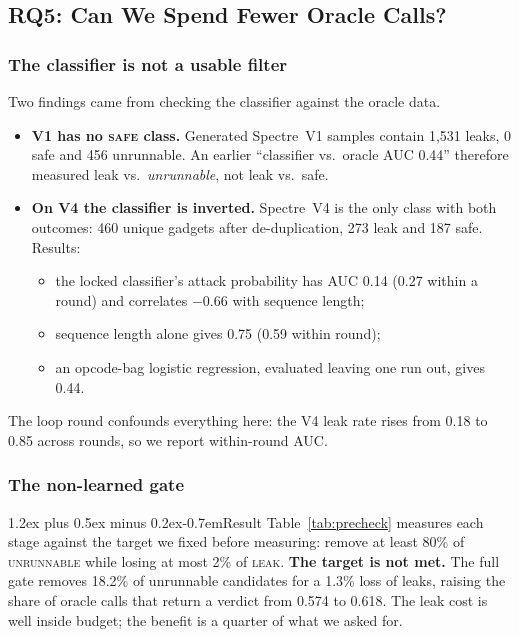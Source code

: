 \documentclass[conference]{IEEEtran}
\makeatletter
\renewcommand\paragraph{\@startsection{paragraph}{4}{\z@}%
  {1.2ex plus 0.5ex minus 0.2ex}{-0.7em}{\normalfont\normalsize\bfseries}}
\makeatother
\begin{document}

\subsection{RQ5: Can We Spend Fewer Oracle Calls?}
\label{sec:rank}

\subsubsection{The classifier is not a usable filter}
Two findings came from checking the classifier against the oracle data.
\begin{itemize}[itemsep=1pt,leftmargin=1.2em]
  \item \textbf{V1 has no {\normalfont\textsc{safe}} class.} Generated Spectre~V1 samples
    contain 1,531 leaks, 0 safe and 456 unrunnable. An earlier
    ``classifier vs.\ oracle AUC 0.44'' therefore measured leak vs.\
    \emph{unrunnable}, not leak vs.\ safe.
  \item \textbf{On V4 the classifier is inverted.} Spectre~V4 is the only
    class with both outcomes: 460 unique gadgets after de-duplication, 273
    leak and 187 safe. Results:
    \begin{itemize}[itemsep=0pt,leftmargin=1em]
      \item the locked classifier's attack probability has AUC 0.14 (0.27
        within a round) and correlates $-0.66$ with sequence length;
      \item sequence length alone gives 0.75 (0.59 within round);
      \item an opcode-bag logistic regression, evaluated leaving one run
        out, gives 0.44.
    \end{itemize}
\end{itemize}
The loop round confounds everything here: the V4 leak rate rises from 0.18 to 0.85
across rounds, so we report within-round AUC.

\subsubsection{The non-learned gate}
\label{sec:precheck-results}
\paragraph{Result}
Table~\ref{tab:precheck} measures each stage against the target we fixed
before measuring: remove at least 80\% of \textsc{unrunnable} while losing at
most 2\% of \textsc{leak}. \textbf{The target is not met.} The full gate removes
18.2\% of unrunnable candidates for a 1.3\% loss of leaks, raising the share of
oracle calls that return a verdict from 0.574 to 0.618. The leak cost is well
inside budget; the benefit is a quarter of what we asked for.
\end{document}

